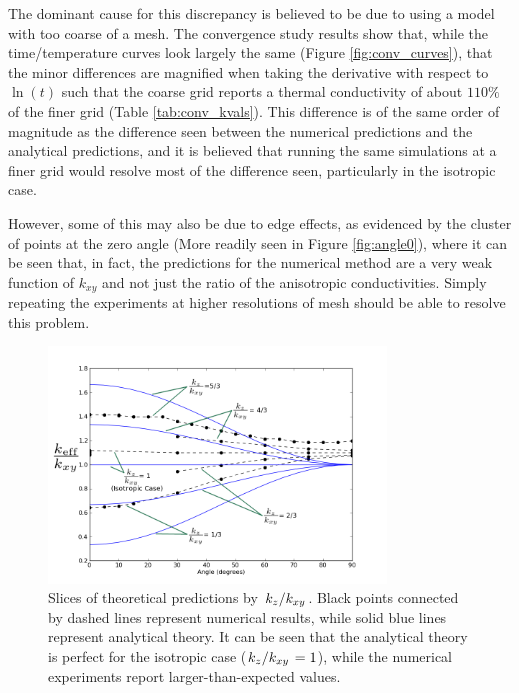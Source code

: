 The dominant cause for this discrepancy is believed to be due to using a model with too
coarse of a mesh. The convergence study results show that, while the time/temperature curves look
largely the same (Figure \ref{fig:conv_curves}), that the minor differences are magnified when taking the
derivative with respect to \(\ln(t)\) such that the coarse grid reports a
thermal conductivity of about \(110\%\) of the finer grid (Table \ref{tab:conv_kvals}).
This difference is of the same order of magnitude as the difference seen between
the numerical predictions and the analytical predictions, and it is believed that
running the same simulations at a finer grid would resolve most of the difference
seen, particularly in the isotropic case.

However, some of this may also be due to edge effects, as evidenced by the cluster
of points at the zero angle
(More readily seen in Figure \ref{fig:angle0}), where it can be seen that, in fact,
the predictions for the numerical method are a very weak function of \(k_{xy}\)
and not just the ratio of the anisotropic conductivities. Simply repeating the
experiments at higher resolutions of mesh should be able to resolve this problem.

\begin{figure}[h]
\centering
\includegraphics[width=0.8\textwidth]{fig/byKratio.png}
\caption{Slices of theoretical predictions by \(\left.{k_z}\middle/{k_{xy}}\right.\). Black points connected by dashed lines represent numerical results, while solid blue lines represent analytical theory. It can be seen that the analytical theory
is perfect for the isotropic case (\(\left.{k_z}\middle/{k_{xy}}\right. = 1\)), while the numerical experiments report larger-than-expected values.}
\label{fig:by_kratio}
\end{figure}

